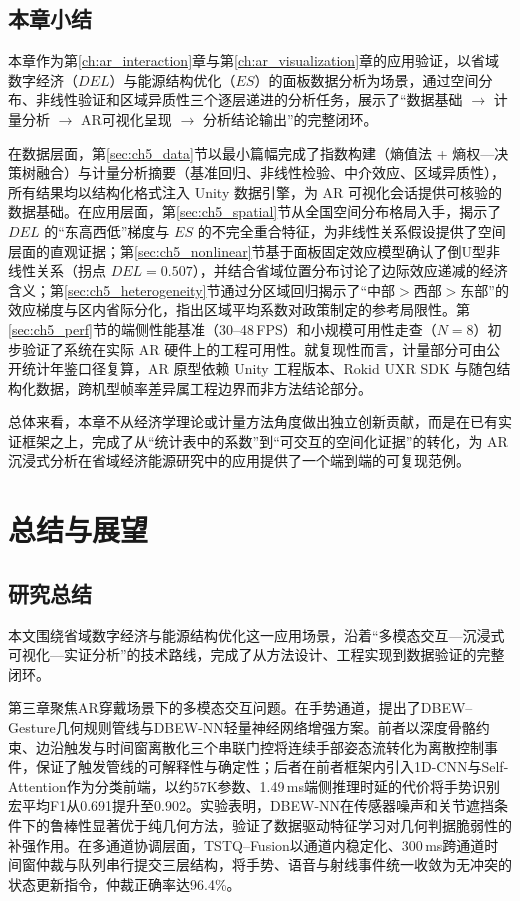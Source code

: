 \section{本章小结}
\label{sec:ch5_summary}

本章作为第\ref{ch:ar_interaction}章与第\ref{ch:ar_visualization}章的应用验证，以省域数字经济（$DEL$）与能源结构优化（$ES$）的面板数据分析为场景，通过空间分布、非线性验证和区域异质性三个逐层递进的分析任务，展示了``数据基础 $\rightarrow$ 计量分析 $\rightarrow$ AR可视化呈现 $\rightarrow$ 分析结论输出''的完整闭环。

在数据层面，第\ref{sec:ch5_data}节以最小篇幅完成了指数构建（熵值法 + 熵权—决策树融合）与计量分析摘要（基准回归、非线性检验、中介效应、区域异质性），所有结果均以结构化格式注入 Unity 数据引擎，为 AR 可视化会话提供可核验的数据基础。在应用层面，第\ref{sec:ch5_spatial}节从全国空间分布格局入手，揭示了 $DEL$ 的``东高西低''梯度与 $ES$ 的不完全重合特征，为非线性关系假设提供了空间层面的直观证据；第\ref{sec:ch5_nonlinear}节基于面板固定效应模型确认了倒U型非线性关系（拐点 $DEL=0.507$），并结合省域位置分布讨论了边际效应递减的经济含义；第\ref{sec:ch5_heterogeneity}节通过分区域回归揭示了``中部$>$西部$>$东部''的效应梯度与区内省际分化，指出区域平均系数对政策制定的参考局限性。第\ref{sec:ch5_perf}节的端侧性能基准（30--48\,FPS）和小规模可用性走查（$N=8$）初步验证了系统在实际 AR 硬件上的工程可用性。就复现性而言，计量部分可由公开统计年鉴口径复算，AR 原型依赖 Unity 工程版本、Rokid UXR SDK 与随包结构化数据，跨机型帧率差异属工程边界而非方法结论部分。

总体来看，本章不从经济学理论或计量方法角度做出独立创新贡献，而是在已有实证框架之上，完成了从``统计表中的系数''到``可交互的空间化证据''的转化，为 AR 沉浸式分析在省域经济能源研究中的应用提供了一个端到端的可复现范例。


\chapter{总结与展望}
\label{ch:summary}

\section{研究总结}

本文围绕省域数字经济与能源结构优化这一应用场景，沿着``多模态交互—沉浸式可视化—实证分析''的技术路线，完成了从方法设计、工程实现到数据验证的完整闭环。

第三章聚焦AR穿戴场景下的多模态交互问题。在手势通道，提出了DBEW--Gesture几何规则管线与DBEW-NN轻量神经网络增强方案。前者以深度骨骼约束、边沿触发与时间窗离散化三个串联门控将连续手部姿态流转化为离散控制事件，保证了触发管线的可解释性与确定性；后者在前者框架内引入1D-CNN与Self-Attention作为分类前端，以约57K参数、1.49\,ms端侧推理时延的代价将手势识别宏平均F1从0.691提升至0.902。实验表明，DBEW-NN在传感器噪声和关节遮挡条件下的鲁棒性显著优于纯几何方法，验证了数据驱动特征学习对几何判据脆弱性的补强作用。在多通道协调层面，TSTQ--Fusion以通道内稳定化、300\,ms跨通道时间窗仲裁与队列串行提交三层结构，将手势、语音与射线事件统一收敛为无冲突的状态更新指令，仲裁正确率达96.4\%。

